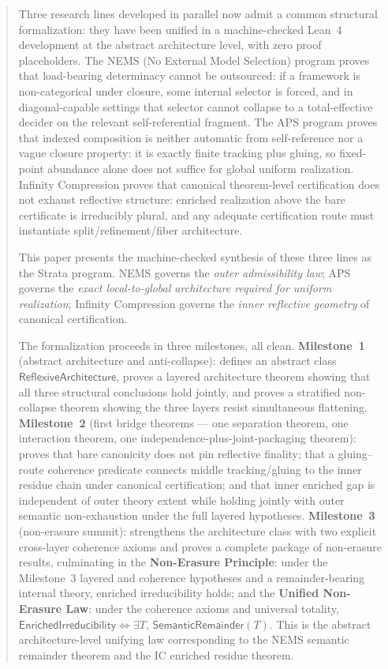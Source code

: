 \documentclass[11pt]{article}
\newcommand{\SemRem}{\ensuremath{\mathsf{SemanticRemainder}}}
\newcommand{\RAL}{\ensuremath{\mathsf{ReflexiveArchitecture}}}
\newcommand{\EnrIrr}{\ensuremath{\mathsf{EnrichedIrreducibility}}}
\begin{document}
\begin{abstract}
\raggedright
Three research lines developed in parallel now admit a common structural formalization:
they have been unified in a machine-checked Lean~4 development at the abstract
architecture level, with zero proof placeholders.  The NEMS (No External Model Selection) program proves that load-bearing determinacy cannot
be outsourced: if a framework is non-categorical under closure, some internal selector is
forced, and in diagonal-capable settings that selector cannot collapse to a total-effective
decider on the relevant self-referential fragment.  The APS program proves that indexed
composition is neither automatic from self-reference nor a vague closure property: it is
exactly finite tracking plus gluing, so fixed-point abundance alone does not suffice for
global uniform realization.  Infinity Compression proves that canonical theorem-level
certification does not exhaust reflective structure: enriched realization above the bare
certificate is irreducibly plural, and any adequate certification route must instantiate
split/refinement/fiber architecture.

This paper presents the machine-checked synthesis of these three lines as the Strata
program.  NEMS governs the \emph{outer admissibility law}; APS governs the \emph{exact
local-to-global architecture required for uniform realization}; Infinity Compression
governs the \emph{inner reflective geometry} of canonical certification.

The formalization proceeds in three milestones, all clean.  \textbf{Milestone~1}
(abstract architecture and anti-collapse): defines an abstract class $\RAL$, proves a
layered architecture theorem showing that all three structural conclusions hold jointly, and
proves a stratified non-collapse theorem showing the three layers resist simultaneous
flattening.  \textbf{Milestone~2} (first bridge theorems --- one separation theorem, one interaction
theorem, one independence-plus-joint-packaging theorem): proves that bare canonicity does not pin reflective
finality; that a gluing--route coherence predicate connects middle tracking/gluing to the
inner residue chain under canonical certification; and that inner enriched gap is
independent of outer theory extent while holding jointly with outer semantic
non-exhaustion under the full layered hypotheses.  \textbf{Milestone~3} (non-erasure
summit): strengthens the architecture class with two explicit cross-layer coherence
axioms and proves a complete package of non-erasure results, culminating in the
\textbf{Non-Erasure Principle}: under the Milestone~3 layered and coherence hypotheses and
a remainder-bearing internal theory, enriched irreducibility holds; and the \textbf{Unified
Non-Erasure Law}: under the coherence axioms and universal totality, $\EnrIrr \iff \exists
T,\,\SemRem(T)$.  This is the abstract architecture-level unifying law corresponding to the NEMS
semantic remainder theorem and the IC enriched residue theorem.


\end{abstract}
\end{document}
